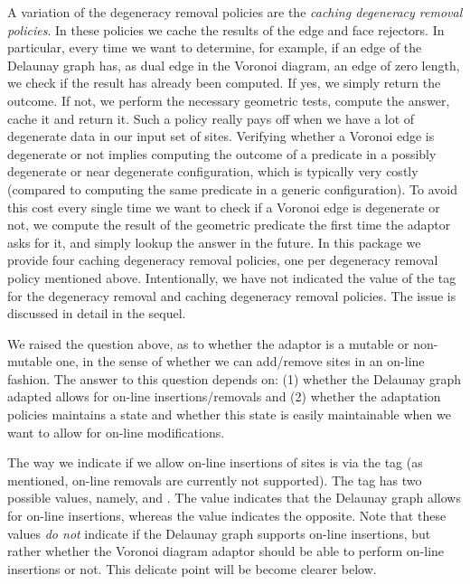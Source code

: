 A variation of the degeneracy removal policies are the
\emph{caching degeneracy removal policies}. In these policies we cache
the results of the edge and face rejectors. In particular, every time
we want to determine, for example, if an edge of the Delaunay graph
has, as dual edge in the Voronoi diagram, an edge of zero length, we
check if the result has already been computed. If yes, we simply
return the outcome. If not, we perform the necessary geometric tests,
compute the answer, cache it and return it. Such a policy really pays
off when we have a lot of degenerate data in our input set of
sites. Verifying whether a Voronoi edge is degenerate or not implies
computing the outcome of a predicate in a possibly degenerate or near
degenerate configuration, which is typically very costly (compared to
computing the same predicate in a generic configuration). To avoid this cost
every single time we want to check if a Voronoi edge is degenerate or
not, we compute the result of the geometric predicate the first time
the adaptor asks for it, and simply lookup the answer in the future.
In this package we provide four caching degeneracy removal policies,
one per degeneracy removal policy mentioned above.
Intentionally, we have not indicated the value of the
 tag for the degeneracy removal and caching
degeneracy removal policies. The issue is discussed in detail in the
sequel.

We raised the question above, as to whether the adaptor is a mutable
or non-mutable one, in the sense of whether we can add/remove sites in
an on-line fashion. The answer to this question depends on: (1) whether the
Delaunay graph adapted allows for on-line insertions/removals and (2)
whether the adaptation policies maintains a state and whether this
state is easily maintainable when we want to allow for on-line
modifications.

The way we indicate if we allow on-line insertions of sites is via the
 tag (as mentioned, on-line removals are currently not
supported). The  tag has two possible values,
namely,  and . The value
 indicates that the Delaunay graph allows for
on-line insertions, whereas the value  indicates
the opposite. Note that these values \emph{do not} indicate if the
Delaunay graph supports on-line insertions, but rather whether the
Voronoi diagram adaptor should be able to perform on-line insertions
or not. This delicate point will be become clearer below.

